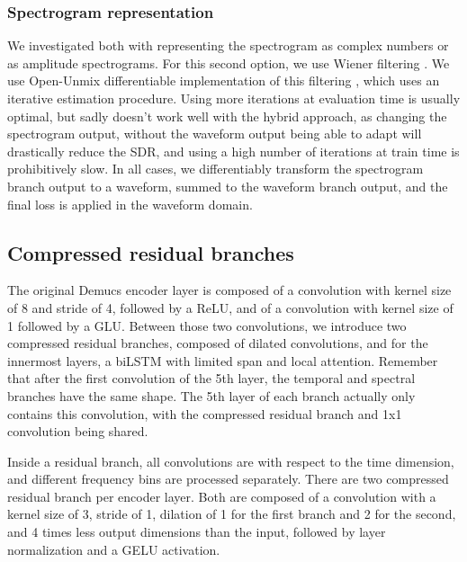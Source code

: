 \documentclass[10pt,a4paper,onecolumn]{article}
\begin{document}
\hypertarget{spectrogram-representation}{%
\subsubsection{Spectrogram
representation}\label{spectrogram-representation}}

We investigated both with representing the spectrogram as complex
numbers \citep{cac} or as amplitude spectrograms. For this second
option, we use Wiener filtering \citep{wiener}. We use Open-Unmix
differentiable implementation of this filtering \citep{umx}, which uses
an iterative estimation procedure. Using more iterations at evaluation
time is usually optimal, but sadly doesn't work well with the hybrid
approach, as changing the spectrogram output, without the waveform
output being able to adapt will drastically reduce the SDR, and using a
high number of iterations at train time is prohibitively slow. In all
cases, we differentiably transform the spectrogram branch output to a
waveform, summed to the waveform branch output, and the final loss is
applied in the waveform domain.

\hypertarget{compressed-residual-branches}{%
\subsection{Compressed residual
branches}\label{compressed-residual-branches}}

The original Demucs encoder layer is composed of a convolution with
kernel size of 8 and stride of 4, followed by a ReLU, and of a
convolution with kernel size of 1 followed by a GLU. Between those two
convolutions, we introduce two compressed residual branches, composed of
dilated convolutions, and for the innermost layers, a biLSTM with
limited span and local attention. Remember that after the first
convolution of the 5th layer, the temporal and spectral branches have
the same shape. The 5th layer of each branch actually only contains this
convolution, with the compressed residual branch and 1x1 convolution
being shared.

Inside a residual branch, all convolutions are with respect to the time
dimension, and different frequency bins are processed separately. There
are two compressed residual branch per encoder layer. Both are composed
of a convolution with a kernel size of 3, stride of 1, dilation of 1 for
the first branch and 2 for the second, and 4 times less output
dimensions than the input, followed by layer normalization
\citep{layernorm} and a GELU activation.
\end{document}
